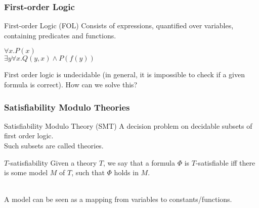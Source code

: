 \documentclass{beamer}
\makeatletter
\newcommand{\hl}{\textcolor{fibeamer@darkBlue} }
\theoremstyle{definition} %
\makeatother
\begin{document}
\begin{frame}
    \frametitle{First-order Logic}

    \begin{block}{First-order Logic (FOL)}
        Consists of expressions, quantified over variables, containing predicates and functions.
    \end{block}

    \begin{example}
        $\forall x.P(x)$\\
        $\exists y \forall x.Q(y, x) \wedge P(f(y))$\\
    \end{example}


    \pause
    First order logic is undecidable (in general, it is impossible to check if a given formula is correct).
    How can we solve this?
\end{frame}

\begin{frame}
    \frametitle{Satisfiability Modulo Theories}

    \begin{block}{Satisfiability Modulo Theory (SMT)}
        A decision problem on decidable subsets of first order logic.\\
        Such subsets are called theories.
    \end{block}

    \begin{block}{$T$-satisfiability}
        Given a theory \hl{$T$}, we say that a formula \hl{$\Phi$} is \hl{$T$}-satisfiable iff there is some model \hl{$M$} of \hl{$T$}, such that \hl{$\Phi$} holds in \hl{$M$}.
    \end{block}~\\

    A model can be seen as a mapping from variables to constants/functions.

\end{frame}
\end{document}
